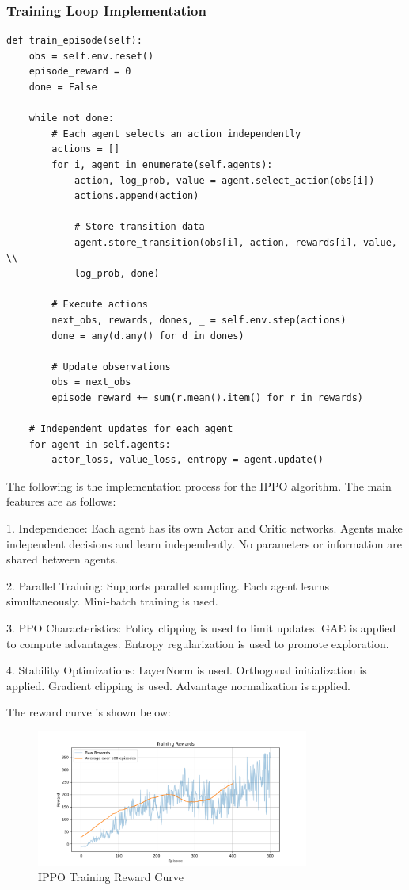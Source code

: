 \documentclass[12pt]{article}
\begin{document}
\subsubsection{Training Loop Implementation}

\begin{verbatim}
def train_episode(self):
    obs = self.env.reset()
    episode_reward = 0
    done = False
    
    while not done:
        # Each agent selects an action independently
        actions = []
        for i, agent in enumerate(self.agents):
            action, log_prob, value = agent.select_action(obs[i])
            actions.append(action)
            
            # Store transition data
            agent.store_transition(obs[i], action, rewards[i], value, \\
            log_prob, done)
        
        # Execute actions
        next_obs, rewards, dones, _ = self.env.step(actions)
        done = any(d.any() for d in dones)
        
        # Update observations
        obs = next_obs
        episode_reward += sum(r.mean().item() for r in rewards)
    
    # Independent updates for each agent
    for agent in self.agents:
        actor_loss, value_loss, entropy = agent.update()
\end{verbatim}

The following is the implementation process for the IPPO algorithm. The main features are as follows:

1. Independence:
   Each agent has its own Actor and Critic networks.
   Agents make independent decisions and learn independently.
   No parameters or information are shared between agents.

2. Parallel Training:
   Supports parallel sampling.
   Each agent learns simultaneously.
   Mini-batch training is used.

3. PPO Characteristics:
   Policy clipping is used to limit updates.
   GAE is applied to compute advantages.
   Entropy regularization is used to promote exploration.

4. Stability Optimizations:
   LayerNorm is used.
   Orthogonal initialization is applied.
   Gradient clipping is used.
   Advantage normalization is applied.

The reward curve is shown below:

\begin{figure}[H]
    \centering
    \includegraphics[width=0.8\textwidth]{ippo_training_rewards.png}
    \caption{IPPO Training Reward Curve}
    \label{fig:ippo_rewards}
\end{figure}
\end{document}
